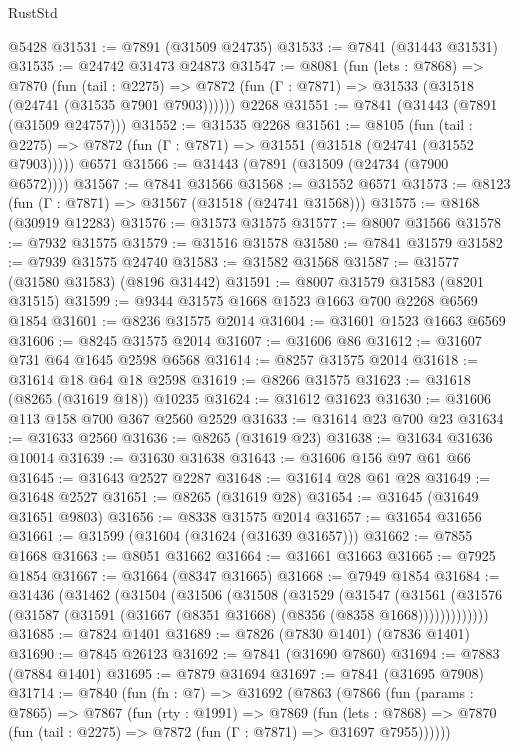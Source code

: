 \begin{lexlean}{RustStd}
\begin{coremodule}
    @5428
@31531 := @7891 (@31509 @24735)
@31533 := @7841 (@31443 @31531)
@31535 := @24742 @31473 @24873
@31547 := @8081
    (fun (lets : @7868) =>
    @7870
      (fun (tail : @2275) =>
      @7872 (fun (Γ : @7871) => @31533 (@31518 (@24741 (@31535 @7901 @7903))))))
    @2268
@31551 := @7841 (@31443 (@7891 (@31509 @24757)))
@31552 := @31535 @2268
@31561 := @8105
    (fun (tail : @2275) => @7872 (fun (Γ : @7871) => @31551 (@31518 (@24741 (@31552 @7903)))))
    @6571
@31566 := @31443 (@7891 (@31509 (@24734 (@7900 @6572))))
@31567 := @7841 @31566
@31568 := @31552 @6571
@31573 := @8123 (fun (Γ : @7871) => @31567 (@31518 (@24741 @31568)))
@31575 := @8168 (@30919 @12283)
@31576 := @31573 @31575
@31577 := @8007 @31566
@31578 := @7932 @31575
@31579 := @31516 @31578
@31580 := @7841 @31579
@31582 := @7939 @31575 @24740
@31583 := @31582 @31568
@31587 := @31577 (@31580 @31583) (@8196 @31442)
@31591 := @8007 @31579 @31583 (@8201 @31515)
@31599 := @9344 @31575 @1668 @1523 @1663 @700 @2268 @6569 @1854
@31601 := @8236 @31575 @2014
@31604 := @31601 @1523 @1663 @6569
@31606 := @8245 @31575 @2014
@31607 := @31606 @86
@31612 := @31607 @731 @64 @1645 @2598 @6568
@31614 := @8257 @31575 @2014
@31618 := @31614 @18 @64 @18 @2598
@31619 := @8266 @31575
@31623 := @31618 (@8265 (@31619 @18)) @10235
@31624 := @31612 @31623
@31630 := @31606 @113 @158 @700 @367 @2560 @2529
@31633 := @31614 @23 @700 @23
@31634 := @31633 @2560
@31636 := @8265 (@31619 @23)
@31638 := @31634 @31636 @10014
@31639 := @31630 @31638
@31643 := @31606 @156 @97 @61 @66
@31645 := @31643 @2527 @2287
@31648 := @31614 @28 @61 @28
@31649 := @31648 @2527
@31651 := @8265 (@31619 @28)
@31654 := @31645 (@31649 @31651 @9803)
@31656 := @8338 @31575 @2014
@31657 := @31654 @31656
@31661 := @31599 (@31604 (@31624 (@31639 @31657)))
@31662 := @7855 @1668
@31663 := @8051 @31662
@31664 := @31661 @31663
@31665 := @7925 @1854
@31667 := @31664 (@8347 @31665)
@31668 := @7949 @1854
@31684 := @31436
    (@31462
      (@31504
        (@31506
          (@31508
            (@31529
              (@31547
                (@31561
                  (@31576 (@31587 (@31591 (@31667 (@8351 @31668) (@8356 (@8358 @1668)))))))))))))
@31685 := @7824 @1401
@31689 := @7826 (@7830 @1401) (@7836 @1401)
@31690 := @7845 @26123
@31692 := @7841 (@31690 @7860)
@31694 := @7883 (@7884 @1401)
@31695 := @7879 @31694
@31697 := @7841 (@31695 @7908)
@31714 := @7840
    (fun (fn : @7) =>
    @31692
      (@7863
        (@7866
          (fun (params : @7865) =>
          @7867
            (fun (rty : @1991) =>
            @7869
              (fun (lets : @7868) =>
              @7870 (fun (tail : @2275) => @7872 (fun (Γ : @7871) => @31697 @7955))))))

\end{coremodule}
\end{lexlean}
